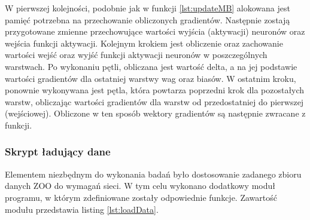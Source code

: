 \documentclass[12pt,twoside]{article}
\begin{document}
W pierwszej kolejności, podobnie jak w funkcji \ref{lst:updateMB} alokowana jest pamięć potrzebna na przechowanie obliczonych gradientów.
Następnie zostają przygotowane zmienne przechowujące wartości wyjścia (aktywacji) neuronów oraz wejścia funkcji aktywacji.
Kolejnym krokiem jest obliczenie oraz zachowanie wartości wejść oraz wyjść funkcji aktywacji neuronów w poszczególnych warstwach.
Po wykonaniu pętli, obliczana jest wartość delta, a na jej podstawie wartości gradientów dla ostatniej warstwy wag oraz biasów.
W ostatnim kroku, ponownie wykonywana jest pętla, która powtarza poprzedni krok dla pozostałych warstw, obliczając wartości gradientów dla warstw od przedostatniej do pierwszej (wejściowej).
Obliczone w ten sposób wektory gradientów są następnie zwracane z funkcji.

\subsubsection{Skrypt ładujący dane}
Elementem niezbędnym do wykonania badań było dostosowanie zadanego zbioru danych ZOO do wymagań sieci.
W tym celu wykonano dodatkowy moduł programu, w którym zdefiniowane zostały odpowiednie funkcje.
Zawartość modułu przedstawia listing \ref{lst:loadData}.
\end{document}
